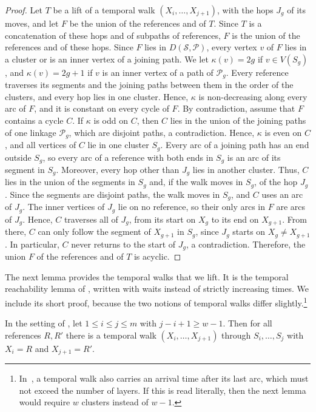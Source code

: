\documentclass[fontsize=12pt,leading=14pt]{fullpaper}
\newcommand{\Pcal}{\mathcal{P}}
\newcommand{\Scal}{\mathcal{S}}
\begin{document}
\begin{proof}
  Let $T$ be a lift of a temporal walk $(X_i,\dots,X_{j+1})$, with the hops $J_g$ of its moves, and let $F$ be the union of the references and of $T$.
  Since $T$ is a concatenation of these hops and of subpaths of references, $F$ is the union of the references and of these hops.
  Since $F$ lies in $D(\Scal,\Pcal)$, every vertex $v$ of $F$ lies in a cluster or is an inner vertex of a joining path.
  We let $\kappa(v)=2g$ if $v\in V(S_g)$, and $\kappa(v)=2g+1$ if $v$ is an inner vertex of a path of $\Pcal_g$.
  Every reference traverses its segments and the joining paths between them in the order of the clusters, and every hop lies in one cluster.
  Hence, $\kappa$ is non-decreasing along every arc of $F$, and it is constant on every cycle of $F$.
  By contradiction, assume that $F$ contains a cycle $C$.
  If $\kappa$ is odd on $C$, then $C$ lies in the union of the joining paths of one linkage $\Pcal_g$, which are disjoint paths, a contradiction.
  Hence, $\kappa$ is even on $C$, and all vertices of $C$ lie in one cluster $S_g$.
  Every arc of a joining path has an end outside $S_g$, so every arc of a reference with both ends in $S_g$ is an arc of its segment in $S_g$.
  Moreover, every hop other than $J_g$ lies in another cluster.
  Thus, $C$ lies in the union of the segments in $S_g$ and, if the walk moves in $S_g$, of the hop $J_g$.
  Since the segments are disjoint paths, the walk moves in $S_g$, and $C$ uses an arc of $J_g$.
  The inner vertices of $J_g$ lie on no reference, so their only arcs in $F$ are arcs of $J_g$.
  Hence, $C$ traverses all of $J_g$, from its start on $X_g$ to its end on $X_{g+1}$.
  From there, $C$ can only follow the segment of $X_{g+1}$ in $S_g$, since $J_g$ starts on $X_g\ne X_{g+1}$.
  In particular, $C$ never returns to the start of $J_g$, a contradiction.
  Therefore, the union $F$ of the references and of $T$ is acyclic.
\end{proof}

The next lemma provides the temporal walks that we lift.
It is the temporal reachability lemma of \textcite[Lemma~6.18]{HKMM26a}, written with waits instead of strictly increasing times.
We include its short proof, because the two notions of temporal walks differ slightly.\footnote{In~\cite[Definition~6.2]{HKMM26a}, a temporal walk also carries an arrival time after its last arc, which must not exceed the number of layers. If this is read literally, then the next lemma would require $w$ clusters instead of $w-1$.}

\begin{lemma}\label{lem:s3-walks}
  In the setting of , let $1\le i\le j\le m$ with $j-i+1\ge w-1$.
  Then for all references $R,R'$ there is a temporal walk $(X_i,\dots,X_{j+1})$ through $S_i,\dots,S_j$ with $X_i=R$ and $X_{j+1}=R'$.
\end{lemma}
\end{document}
